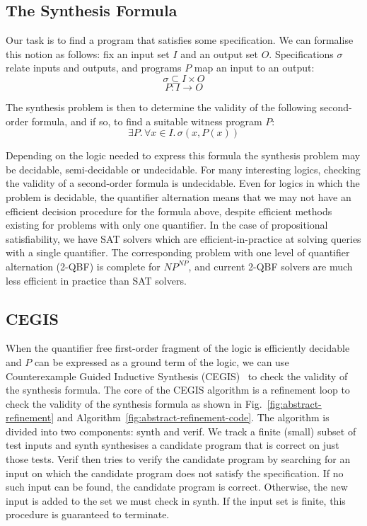 \documentclass[a4paper]{llncs}
\begin{document}
\subsection{The Synthesis Formula}
\label{sec:abstract-formula}

Our task is to find a program that satisfies some specification.  We can formalise this
notion as follows: fix an input set $I$ and an output set $O$.  Specifications $\sigma$
relate inputs and outputs, and programs $P$ map an input to an output:
%
$$ \sigma \subseteq I \times O $$
$$ P : I \rightarrow O$$

The synthesis problem is then to determine the validity of the following
second-order formula, and if so, to find a suitable witness program $P$:
%
$$\exists P .\, \forall x \in I.\, \sigma(x, P(x))$$

Depending on the logic needed to express this formula the synthesis problem
may be decidable, semi-decidable or undecidable.  For many interesting
logics, checking the validity of a second-order formula is undecidable. 
Even for logics in which the problem is decidable, the quantifier
alternation means that we may not have an efficient decision procedure for
the formula above, despite efficient methods existing for problems
with only one quantifier.  In the case of propositional
satisfiability, we have SAT solvers which are efficient-in-practice at
solving queries with a single quantifier.  The corresponding problem with
one level of quantifier alternation (2-QBF) is complete for $NP^{NP}$, and
current 2-QBF solvers are much less efficient in practice than SAT solvers.

\subsection{CEGIS}

When the quantifier free first-order fragment of the logic is efficiently decidable and
$P$ can be expressed as a ground term of the logic, we can use
Counterexample Guided Inductive Synthesis (CEGIS)~\cite{lezama-thesis,sketch} to
check the validity of the synthesis formula.  The core of the CEGIS algorithm is
a refinement loop to check the
validity of the synthesis formula as shown in Fig.~\ref{fig:abstract-refinement} and
Algorithm~\ref{fig:abstract-refinement-code}.  The algorithm is divided into two
components: {\sc synth} and {\sc verif}.  We track a finite (small) subset of test inputs
and {\sc synth} synthesises a candidate program that is correct on just those tests.
{\sc Verif} then tries to verify the candidate program by searching for an input on
which the candidate program does not satisfy the specification.  If no such input
can be found, the candidate program is correct.  Otherwise, the new input is added
to the set we must check in {\sc synth}.  If the input set is finite, this
procedure is guaranteed to terminate.
\end{document}
